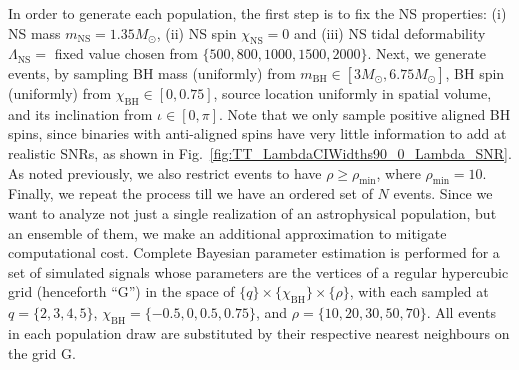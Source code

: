 \documentclass[aps,prd,amsmath,floats,floatfix, twocolumn,
superscriptaddress,nofootinbib,showpacs]{revtex4-1}
\newcommand{\prayush}{\textcolor{red!40!black}}
\newcommand{\lambdans}{\Lambda_\mathrm{NS}}
\newcommand{\chibh}{\chi_\mathrm{BH}}
\newcommand{\chins}{\chi_\mathrm{NS}}
\newcommand{\mbh}{m_\mathrm{BH}}
\newcommand{\mns}{m_\mathrm{NS}}
\begin{document}
In order to generate each population, the first step is to fix
the NS properties: (i) NS mass $\mns=1.35M_\odot$, (ii) NS spin $\chins=0$
and (iii) NS tidal deformability $\lambdans=$ fixed value chosen from
$\{500,800,1000,1500,2000\}$. Next, we generate events, by sampling BH mass
(uniformly) from $\mbh\in[3M_\odot,6.75M_\odot]$, BH spin (uniformly)
from $\chibh\in[0, 0.75]$, source location uniformly in spatial volume,
and its inclination from $\iota\in[0,\pi]$. \prayush{Note that we only
sample positive aligned BH spins, since binaries with anti-aligned spins have
very little information to add at realistic SNRs, as shown in 
Fig.~\ref{fig:TT_LambdaCIWidths90_0_Lambda_SNR}.
}
As noted previously, we also restrict events to have
$\rho\geq\rho_\mathrm{min}$, where $\rho_\mathrm{min}=10$.
Finally, we repeat the process till we have an ordered set of $N$ events.
% 
Since we want to analyze not just a single realization of an astrophysical
population, but an ensemble of them, we make an additional approximation to
mitigate computational cost. Complete Bayesian parameter estimation is
performed for a set of simulated signals whose parameters are the vertices
of a regular hypercubic grid (henceforth ``G'') in the space of
$\{q\}\times\{\chibh\}\times\{\rho\}$, with each sampled at $q=\{2,3,4,5\}$,
$\chibh=\{-0.5,0,0.5,0.75\}$, and $\rho=\{10,20,30,50,70\}$.
All events in each population draw are substituted by their
respective nearest neighbours on the grid G.
\end{document}
